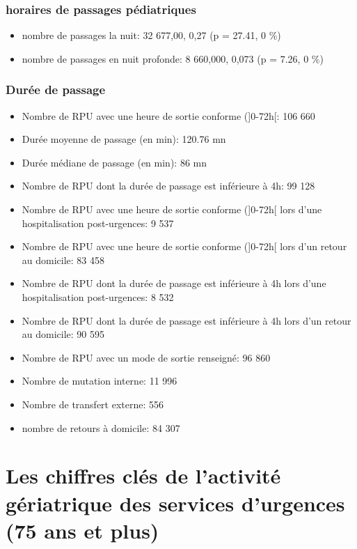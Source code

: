 \documentclass[]{article}
\begin{document}
\subsubsection{horaires de passages
pédiatriques}\label{horaires-de-passages-pediatriques}

\begin{itemize}
\itemsep1pt\parskip0pt
\item
  nombre de passages la nuit: 32 677,00, 0,27 (p = 27.41, 0 \%)
\item
  nombre de passages en nuit profonde: 8 660,000, 0,073 (p = 7.26, 0 \%)
\end{itemize}

\subsubsection{Durée de passage}\label{duree-de-passage}

\begin{itemize}
\item
  Nombre de RPU avec une heure de sortie conforme ({]}0-72h{[}: 106 660
\item
  Durée moyenne de passage (en min): 120.76 mn
\item
  Durée médiane de passage (en min): 86 mn
\item
  Nombre de RPU dont la durée de passage est inférieure à 4h: 99 128
\item
  Nombre de RPU avec une heure de sortie conforme ({]}0-72h{[} lors
  d'une hospitalisation post-urgences: 9 537
\item
  Nombre de RPU avec une heure de sortie conforme ({]}0-72h{[} lors d'un
  retour au domicile: 83 458
\item
  Nombre de RPU dont la durée de passage est inférieure à 4h lors d'une
  hospitalisation post-urgences: 8 532
\item
  Nombre de RPU dont la durée de passage est inférieure à 4h lors d'un
  retour au domicile: 90 595
\item
  Nombre de RPU avec un mode de sortie renseigné: 96 860
\item
  Nombre de mutation interne: 11 996
\item
  Nombre de transfert externe: 556
\item
  nombre de retours à domicile: 84 307
\end{itemize}

\section{Les chiffres clés de l'activité gériatrique des services
d'urgences (75 ans et
plus)}\label{les-chiffres-cles-de-lactivite-geriatrique-des-services-durgences-75-ans-et-plus}
\end{document}
